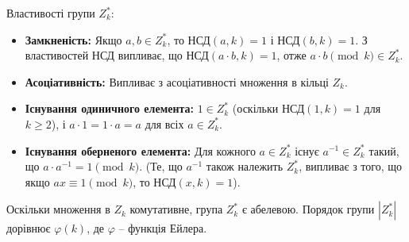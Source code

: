 \documentclass[a4paper,12pt]{article}
\begin{document}
    Властивості групи \(Z_k^*\):
    \begin{itemize}
        \item \textbf{Замкненість:} Якщо \(a, b \in Z_k^*\), то НСД\((a,k)=1\) і НСД\((b,k)=1\). З властивостей НСД випливає, що НСД\((a \cdot b, k)=1\), отже \(a \cdot b \pmod k \in Z_k^*\).
        \item \textbf{Асоціативність:} Випливає з асоціативності множення в кільці \(Z_k\).
        \item \textbf{Існування одиничного елемента:} \(1 \in Z_k^*\) (оскільки НСД\((1,k)=1\) для \(k \ge 2\)), і \(a \cdot 1 = 1 \cdot a = a\) для всіх \(a \in Z_k^*\).
        \item \textbf{Існування оберненого елемента:} Для кожного \(a \in Z_k^*\) існує \(a^{-1} \in Z_k^*\) такий, що \(a \cdot a^{-1} = 1 \pmod k\). (Те, що \(a^{-1}\) також належить \(Z_k^*\), випливає з того, що якщо \(ax \equiv 1 \pmod k\), то НСД\((x,k)=1\)).
    \end{itemize}
    Оскільки множення в \(Z_k\) комутативне, група \(Z_k^*\) є абелевою. Порядок групи \(|Z_k^*|\) дорівнює \(\varphi(k)\), де \(\varphi\) -- функція Ейлера.
\end{document}
